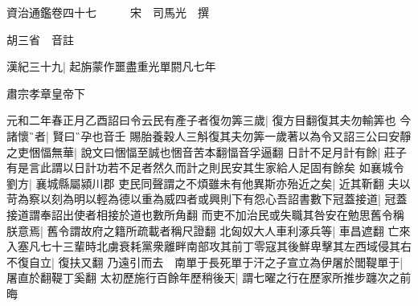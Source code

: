 






























































資治通鑑卷四十七　　　宋　司馬光　撰

胡三省　音註

漢紀三十九|{
	起旃蒙作噩盡重光單閼凡七年}


肅宗孝章皇帝下

元和二年春正月乙酉詔曰令云民有產子者復勿筭三歲|{
	復方目翻復其夫勿輸筭也}
今諸懷者|{
	賢曰孕也音壬}
賜胎養穀人三斛復其夫勿筭一歲著以為令又詔三公曰安靜之吏悃愊無華|{
	說文曰悃愊至誠也悃音苦本翻愊音孚逼翻}
日計不足月計有餘|{
	莊子有是言此謂以日計功若不足者然久而計之則民安其生家給人足固有餘矣}
如襄城令劉方|{
	襄城縣屬潁川郡}
吏民同聲謂之不煩雖未有他異斯亦殆近之矣|{
	近其靳翻}
夫以苛為察以刻為明以輕為德以重為威四者或興則下有怨心吾詔書數下冠蓋接道|{
	冠蓋接道謂奉詔出使者相接於道也數所角翻}
而吏不加治民或失職其咎安在勉思舊令稱朕意焉|{
	舊令謂故府之籍所疏載者稱尺證翻}
北匈奴大人車利涿兵等|{
	車昌遮翻}
亡來入塞凡七十三輩時北虜衰耗黨衆離畔南部攻其前丁零寇其後鮮卑擊其左西域侵其右不復自立|{
	復扶又翻}
乃遠引而去　南單于長死單于汗之子宣立為伊屠於閭鞮單于|{
	屠直於翻鞮丁奚翻}
太初歷施行百餘年歷稍後天|{
	謂七曜之行在歷家所推步躔次之前晦}


